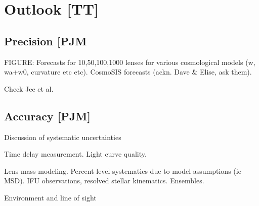 



\section{Outlook [TT]}
\label{sec:outlook}



\subsection{Precision [PJM}

FIGURE: Forecasts for 10,50,100,1000 lenses for various cosmological models (w, wa+w0, curvature etc etc). CosmoSIS forecasts (ackn. Dave \& Elise, ask them).

Check Jee et al.




\subsection{Accuracy [PJM]}



Discussion of systematic uncertainties

Time delay measurement. Light curve quality.

Lens mass modeling. Percent-level systematics due to model assumptions (ie MSD). IFU observations, resolved stellar kinematics. Ensembles.

Environment and line of sight

